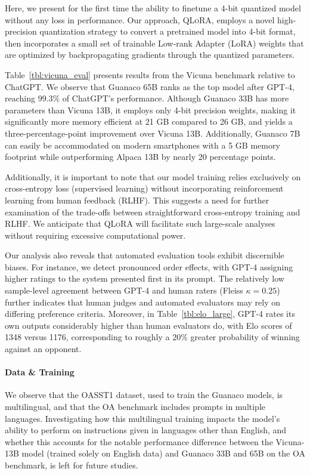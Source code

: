 Here, we present for the first time the ability to finetune a 4-bit quantized model without any loss in performance. Our approach, \textsc{QLoRA}, employs a novel high-precision quantization strategy to convert a pretrained model into 4-bit format, then incorporates a small set of trainable Low-rank Adapter (LoRA) weights \citep{hu2021lora} that are optimized by backpropagating gradients through the quantized parameters.

Table~\ref{tbl:vicuna_eval} presents results from the Vicuna benchmark \cite{vicuna2023} relative to ChatGPT. We observe that {Guanaco} 65B ranks as the top model after GPT-4, reaching 99.3\% of ChatGPT's performance. Although {Guanaco} 33B has more parameters than Vicuna 13B, it employs only 4-bit precision weights, making it significantly more memory efficient at 21 GB compared to 26 GB, and yields a three-percentage-point improvement over Vicuna 13B. Additionally, {Guanaco} 7B can easily be accommodated on modern smartphones with a 5 GB memory footprint while outperforming Alpaca 13B by nearly 20 percentage points.

Additionally, it is important to note that our model training relies exclusively on cross-entropy loss (supervised learning) without incorporating reinforcement learning from human feedback (RLHF). This suggests a need for further examination of the trade-offs between straightforward cross-entropy training and RLHF. We anticipate that \textsc{QLoRA} will facilitate such large-scale analyses without requiring excessive computational power.

Our analysis also reveals that automated evaluation tools exhibit discernible biases. For instance, we detect pronounced order effects, with GPT-4 assigning higher ratings to the system presented first in its prompt. The relatively low sample-level agreement between GPT-4 and human raters (Fleiss $\kappa=0.25$) further indicates that human judges and automated evaluators may rely on differing preference criteria. Moreover, in Table~\ref{tbl:elo_large}, GPT-4 rates its own outputs considerably higher than human evaluators do, with Elo scores of 1348 versus 1176, corresponding to roughly a 20\% greater probability of winning against an opponent.

\paragraph{Data \& Training} We observe that the OASST1 dataset, used to train the {Guanaco} models, is multilingual, and that the OA benchmark includes prompts in multiple languages. Investigating how this multilingual training impacts the model's ability to perform on instructions given in languages other than English, and whether this accounts for the notable performance difference between the Vicuna-13B model (trained solely on English data) and {Guanaco} 33B and 65B on the OA benchmark, is left for future studies.

